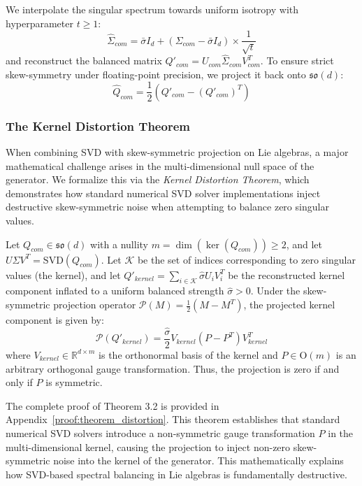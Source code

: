 We interpolate the singular spectrum towards uniform isotropy with hyperparameter $t \ge 1$:
\begin{equation}
\label{eq:spectral_interpolate}
\hat{\Sigma}_{com} = \bar{\sigma} I_d + (\Sigma_{com} - \bar{\sigma} I_d) \times \frac{1}{\sqrt{t}}
\end{equation}
and reconstruct the balanced matrix $Q'_{com} = U_{com} \hat{\Sigma}_{com} V_{com}^T$. To ensure strict skew-symmetry under floating-point precision, we project it back onto $\mathfrak{so}(d)$:
\begin{equation}
\label{eq:projection}
\hat{Q}_{com} = \frac{1}{2}(Q'_{com} - (Q'_{com})^T)
\end{equation}

\subsubsection{The Kernel Distortion Theorem}
When combining SVD with skew-symmetric projection on Lie algebras, a major mathematical challenge arises in the multi-dimensional null space of the generator. We formalize this via the \emph{Kernel Distortion Theorem}, which demonstrates how standard numerical SVD solver implementations inject destructive skew-symmetric noise when attempting to balance zero singular values.

\begin{theorem}
Let $Q_{com} \in \mathfrak{so}(d)$ with a nullity $m = \dim(\ker(Q_{com})) \ge 2$, and let $U \Sigma V^T = \mathrm{SVD}(Q_{com})$. Let $\mathcal{K}$ be the set of indices corresponding to zero singular values (the kernel), and let $Q'_{kernel} = \sum_{i \in \mathcal{K}} \hat{\sigma} U_i V_i^T$ be the reconstructed kernel component inflated to a uniform balanced strength $\hat{\sigma} > 0$. Under the skew-symmetric projection operator $\mathcal{P}(M) = \frac{1}{2}(M - M^T)$, the projected kernel component is given by:
\begin{equation}
\mathcal{P}(Q'_{kernel}) = \frac{\hat{\sigma}}{2} V_{kernel} (P - P^T) V_{kernel}^T
\end{equation}
where $V_{kernel} \in \mathbb{R}^{d \times m}$ is the orthonormal basis of the kernel and $P \in \mathrm{O}(m)$ is an arbitrary orthogonal gauge transformation. Thus, the projection is zero if and only if $P$ is symmetric.
\end{theorem}

The complete proof of Theorem 3.2 is provided in Appendix~\ref{proof:theorem_distortion}. This theorem establishes that standard numerical SVD solvers introduce a non-symmetric gauge transformation $P$ in the multi-dimensional kernel, causing the projection to inject non-zero skew-symmetric noise into the kernel of the generator. This mathematically explains how SVD-based spectral balancing in Lie algebras is fundamentally destructive.

